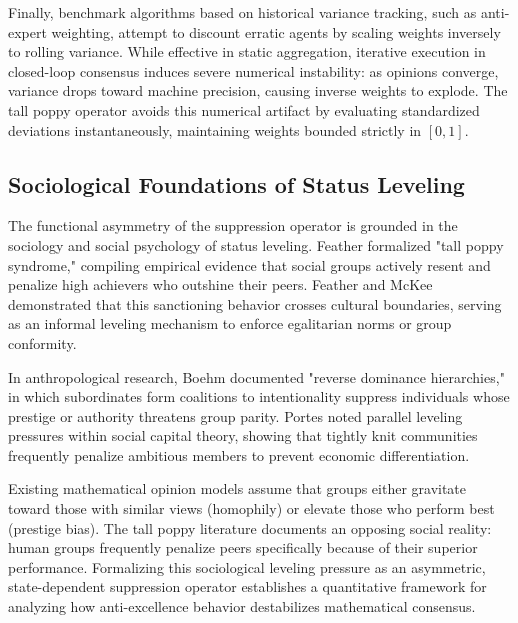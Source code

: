 Finally, benchmark algorithms based on historical variance tracking, such as anti-expert weighting, attempt to discount erratic agents by scaling weights inversely to rolling variance\cite{degroot1974reaching,friedkin1990social}. While effective in static aggregation, iterative execution in closed-loop consensus induces severe numerical instability: as opinions converge, variance drops toward machine precision, causing inverse weights to explode\cite{degroot1974reaching,acemoglu2013opinion}. The tall poppy operator avoids this numerical artifact by evaluating standardized deviations instantaneously, maintaining weights bounded strictly in $[0, 1]$\cite{degroot1974reaching}.

\subsection{Sociological Foundations of Status Leveling}
The functional asymmetry of the suppression operator is grounded in the sociology and social psychology of status leveling\cite{degroot1974reaching}. Feather formalized "tall poppy syndrome," compiling empirical evidence that social groups actively resent and penalize high achievers who outshine their peers\cite{degroot1974reaching,hajnal1958weak}. Feather and McKee demonstrated that this sanctioning behavior crosses cultural boundaries, serving as an informal leveling mechanism to enforce egalitarian norms or group conformity\cite{degroot1974reaching}.

In anthropological research, Boehm documented "reverse dominance hierarchies," in which subordinates form coalitions to intentionality suppress individuals whose prestige or authority threatens group parity\cite{degroot1974reaching}. Portes noted parallel leveling pressures within social capital theory, showing that tightly knit communities frequently penalize ambitious members to prevent economic differentiation\cite{degroot1974reaching}.

Existing mathematical opinion models assume that groups either gravitate toward those with similar views (homophily) or elevate those who perform best (prestige bias)\cite{degroot1974reaching}. The tall poppy literature documents an opposing social reality: human groups frequently penalize peers specifically because of their superior performance\cite{degroot1974reaching}. Formalizing this sociological leveling pressure as an asymmetric, state-dependent suppression operator establishes a quantitative framework for analyzing how anti-excellence behavior destabilizes mathematical consensus\cite{degroot1974reaching}.


